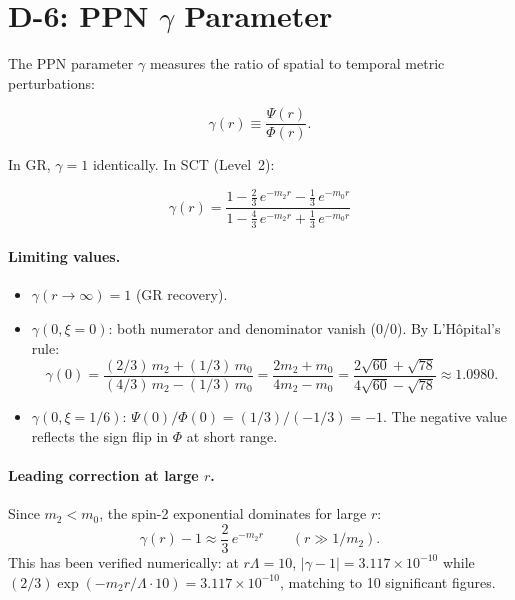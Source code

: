 \documentclass[11pt,a4paper]{article}
\begin{document}
\section{D-6: PPN $\gamma$ Parameter}
\label{sec:gamma}

The PPN parameter $\gamma$ measures the ratio of spatial to temporal
metric perturbations:

\begin{equation}\label{eq:gamma_def}
  \gamma(r) \equiv \frac{\Psi(r)}{\Phi(r)}.
\end{equation}

In GR, $\gamma = 1$ identically.  In SCT (Level~2):

\begin{equation}\label{eq:gamma_level2}
  \boxed{
    \gamma(r) = \frac{1 - \frac{2}{3}\,e^{-m_2 r} - \frac{1}{3}\,e^{-m_0 r}}
                     {1 - \frac{4}{3}\,e^{-m_2 r} + \frac{1}{3}\,e^{-m_0 r}}
  }
\end{equation}

\paragraph{Limiting values.}

\begin{itemize}
  \item $\gamma(r \to \infty) = 1$ \quad(GR recovery).

  \item $\gamma(0, \xi = 0)$: both numerator and denominator vanish (0/0).
    By L'H\^{o}pital's rule:
    \begin{equation}
      \gamma(0) = \frac{(2/3)\,m_2 + (1/3)\,m_0}
                       {(4/3)\,m_2 - (1/3)\,m_0}
               = \frac{2m_2 + m_0}{4m_2 - m_0}
               = \frac{2\sqrt{60} + \sqrt{78}}{4\sqrt{60} - \sqrt{78}}
               \approx 1.0980.
    \end{equation}

  \item $\gamma(0, \xi = 1/6)$: $\Psi(0)/\Phi(0) = (1/3)/(-1/3) = -1$.
    The negative value reflects the sign flip in $\Phi$ at short range.
\end{itemize}

\paragraph{Leading correction at large $r$.}
Since $m_2 < m_0$, the spin-2 exponential dominates for large $r$:
\begin{equation}\label{eq:gamma_correction}
  \gamma(r) - 1 \approx \frac{2}{3}\,e^{-m_2 r}
  \qquad (r \gg 1/m_2).
\end{equation}
This has been verified numerically: at $r\Lambda = 10$,
$|\gamma - 1| = 3.117 \times 10^{-10}$ while
$(2/3)\exp(-m_2 r/\Lambda \cdot 10) = 3.117 \times 10^{-10}$, matching
to 10 significant figures.
\end{document}

